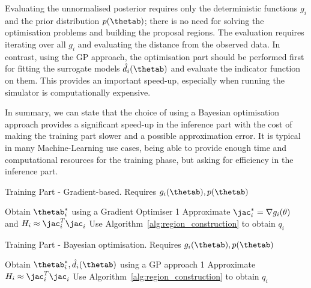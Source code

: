 \noindent
Evaluating the unnormalised posterior requires only the
deterministic functions $g_i$ and the prior distribution $p(\thetab)$;
there is no need for solving the optimisation problems and building
the proposal regions. The evaluation requires iterating over all $g_i$
and evaluating the distance from the observed data. In contrast, using
the GP approach, the optimisation part should be performed first for
fitting the surrogate models $\hat{d}_i(\thetab)$ and evaluate the
indicator function on them. This provides an important speed-up,
especially when running the simulator is computationally
expensive.

\noindent
In summary, we can state that the choice of using a Bayesian
optimisation approach provides a significant speed-up in the inference
part with the cost of making the training part slower and a possible
approximation error. It is typical in many Machine-Learning use cases,
being able to provide enough time and computational resources for the
training phase, but asking for efficiency in the inference
part.

\begin{minipage}{0.46\textwidth}
\begin{algorithm}[H]
    \centering
    \caption{Training Part - Gradient-based. Requires $g_i(\thetab), p(\thetab)$}\label{alg:training_GB}
    \begin{algorithmic}[1]
        \State Obtain $\thetab_i^*$ using a Gradient Optimiser
         1
        \Else
        \State Approximate $\jac_i^* = \nabla g_i(\theta)$ and $H_i \approx \jac^T_i\jac_i$
        \State Use Algorithm~\ref{alg:region_construction} to obtain $q_i$
        \EndIf      
      \EndFor
    \end{algorithmic}
\end{algorithm}
\end{minipage}
\hfill
\begin{minipage}{0.46\textwidth}
\begin{algorithm}[H]
    \centering
    \caption{Training Part - Bayesian optimisation. Requires $g_i(\thetab), p(\thetab)$}\label{alg:training_GP}
    \begin{algorithmic}[1]
        \State Obtain $\thetab_i^*, \hat{d}_i(\thetab)$ using a GP approach
         1
        \Else
        \State Approximate $H_i \approx \jac^T_i \jac_i$
        \State Use Algorithm~\ref{alg:region_construction} to obtain $q_i$
        \EndIf      
      \EndFor
    \end{algorithmic}
\end{algorithm}
\end{minipage}

